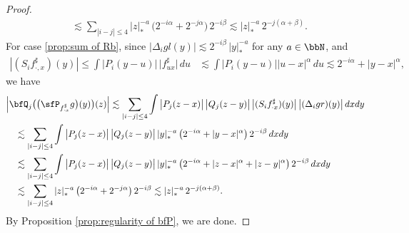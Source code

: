 \begin{proof}
\begin{align*}
&\lesssim\sum_{|i-j|\le4}|z|_*^{-a} \,\bigl(2^{-i\alpha} + 2^{-j\alpha}\bigr)\,2^{-i\beta} \lesssim |z|_*^{-a}\,2^{-j(\alpha+\beta)}.
\end{align*}
For case \eqref{prop:sum of Rb}, since $\big|\Delta_igl(y)\big| \lesssim 2^{-i\beta}\,|y|_*^{-a}$ for any $a\in\bbN$, and
\begin{align*}
|(S_if_{\cdot,x}^\sharp)(y)|\le
\int \big|P_i(y-u)\big|\,\big|f_{ux}^\sharp\big|\,du &\lesssim\int \big|P_i(y-u)\big| |u-x|^\alpha\,du \lesssim 2^{-i\alpha}+|y-x|^\alpha,
\end{align*}
we have
\begin{align*}
&\Big|\bfQ_j\bigl(\bigl(\sfP_{f_{\cdot x}^\sharp}g\bigr)(y)\bigr)(z)\Big|
\lesssim \sum_{|i-j|\le4} \int \big|P_j(z-x)\big|\, \big|Q_j(z-y)\big| \,\big| (S_if_{\cdot x}^\sharp)(y)\big| \,\big|(\Delta_igr)(y)\big|\,dxdy \\
&\quad\lesssim \sum_{|i-j|\le4} \int \big|P_j(z-x)\big| \,\big|Q_j(z-y)\big| \,|y|_*^{-a} \,\bigl(2^{-i\alpha} + |y-x|^\alpha\bigr)\,2^{-i\beta}\,dxdy\\
&\quad\lesssim \sum_{|i-j|\le4} \int \big|P_j(z-x)\big|\,\big|Q_j(z-y)\big|\, |y|_*^{-a} \,\bigl(2^{-i\alpha} + |z-x|^\alpha+|z-y|^\alpha\bigr)\,2^{-i\beta}\,dxdy \\
&\quad\lesssim \sum_{|i-j|\le4} |z|_*^{-a} \,\bigl(2^{-i\alpha}+2^{-j\alpha}\bigr) \,2^{-i\beta} \lesssim |z|_*^{-a}\,2^{-j(\alpha+\beta)}.
\end{align*}
By Proposition \ref{prop:regularity of bfP}, we are done.
\end{proof}

